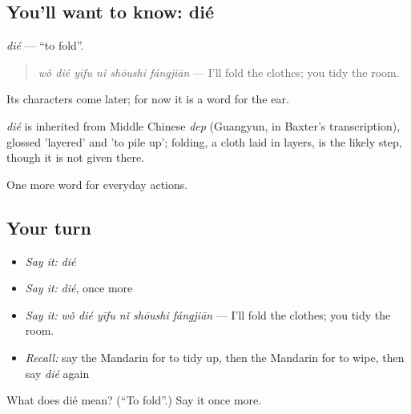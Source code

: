 \subsection*{You'll want to know: dié}
\emph{dié} — \textquotedblleft{}to fold\textquotedblright{}.

\begin{quote}
\emph{wǒ dié yīfu nǐ shōushi fángjiān} — I'll fold the clothes; you tidy the room.
\end{quote}

Its characters come later; for now it is a word for the ear.

\begin{cousinweb}
\emph{dié} is inherited from Middle Chinese \emph{dep} (Guangyun, in Baxter's transcription), glossed 'layered' and 'to pile up'; folding, a cloth laid in layers, is the likely step, though it is not given there.
\end{cousinweb}

\begin{grammarlens}[title={What you've built}]
One more word for everyday actions.
\end{grammarlens}

\subsection*{Your turn}
\begin{itemize}
\raggedright
  \item \emph{Say it:} \emph{dié}
  \item \emph{Say it:} \emph{dié}, once more
  \item \emph{Say it:} \emph{wǒ dié yīfu nǐ shōushi fángjiān} — I'll fold the clothes; you tidy the room.
  \item \emph{Recall:} say the Mandarin for to tidy up, then the Mandarin for to wipe, then say \emph{dié} again
\end{itemize}

\begin{tcolorbox}[breakable,colback=teal!4,colframe=teal!35!black,title={Before you move on}]
What does dié mean? (\textquotedblleft{}To fold\textquotedblright{}.) Say it once more.
\end{tcolorbox}
